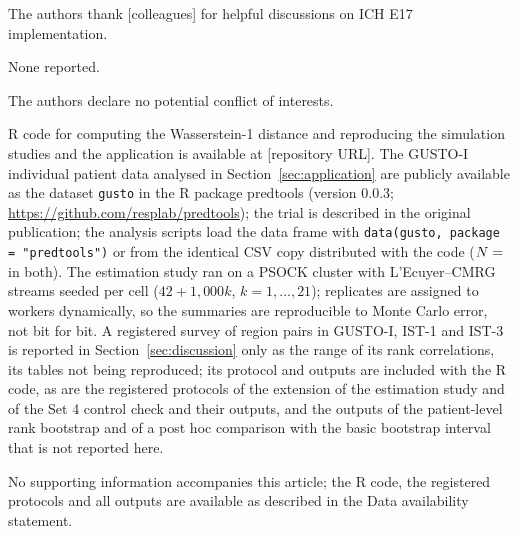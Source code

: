 \documentclass[AMA,Times1COL]{WileyNJDv5}
\begin{document}

The authors thank [colleagues] for helpful discussions on ICH E17 implementation.


None reported.


The authors declare no potential conflict of interests.


R code for computing the Wasserstein-1 distance and reproducing the simulation studies and the application is available at [repository URL]. The GUSTO-I individual patient data analysed in Section~\ref{sec:application} are publicly available as the dataset \texttt{gusto} in the R package predtools (version 0.0.3; \url{https://github.com/resplab/predtools}); the trial is described in the original publication;\cite{gusto1993} the analysis scripts load the data frame with \texttt{data(gusto, package = "predtools")} or from the identical CSV copy distributed with the code ($N = \numval{gustoN}$ in both). The estimation study ran on a PSOCK cluster with L'Ecuyer--CMRG streams seeded per cell ($42 + 1{,}000k$, $k = 1, \ldots, 21$); replicates are assigned to workers dynamically, so the summaries are reproducible to Monte Carlo error, not bit for bit. A registered survey of region pairs in GUSTO-I, IST-1 and IST-3 is reported in Section~\ref{sec:discussion} only as the range of its rank correlations, its tables not being reproduced; its protocol and outputs are included with the R code, as are the registered protocols of the extension of the estimation study and of the Set 4 control check and their outputs, and the outputs of the patient-level rank bootstrap and of a post hoc comparison with the basic bootstrap interval that is not reported here.




No supporting information accompanies this article; the R code, the registered protocols and all outputs are available as described in the Data availability statement.

\appendix


\end{document}
